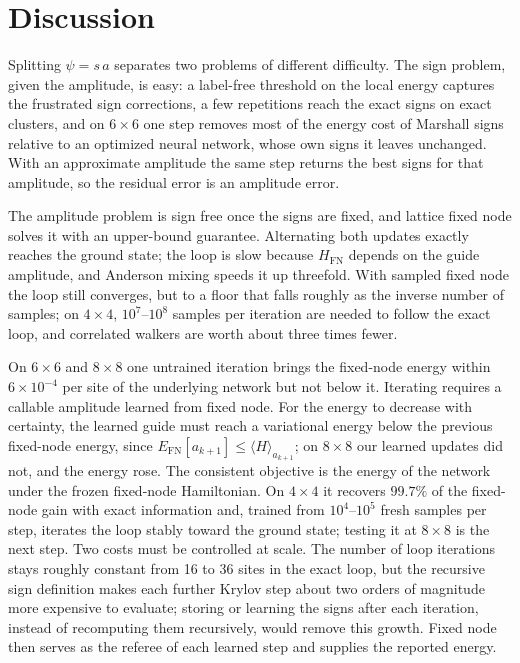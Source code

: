 \documentclass[aps,prb,reprint,onecolumn,superscriptaddress,floatfix]{revtex4-2}
\newcommand{\FN}{\mathrm{FN}}
\begin{document}
\section{Discussion}

Splitting $\psi=s\,a$ separates two problems of different difficulty. The
sign problem, given the amplitude, is easy: a label-free threshold on the
local energy captures the frustrated sign corrections, a few repetitions
reach the exact signs on exact clusters, and on $6\times6$ one step removes
most of the energy cost of Marshall signs relative to an optimized neural
network, whose own signs it leaves unchanged. With an approximate
amplitude the same step returns the best signs for that amplitude, so the
residual error is an amplitude error.

The amplitude problem is sign free once the signs are fixed, and lattice fixed
node solves it with an upper-bound guarantee. Alternating both updates exactly
reaches the ground state; the loop is slow because $H_\FN$ depends on the guide
amplitude, and Anderson mixing speeds it up threefold. With sampled fixed node
the loop still converges, but to a floor that falls roughly as the inverse
number of samples; on $4\times4$, $10^7$--$10^8$ samples per iteration are
needed to follow the exact loop, and correlated walkers are worth about three
times fewer.

On $6\times6$ and $8\times8$ one untrained iteration brings the fixed-node
energy within $6\times10^{-4}$ per site of the underlying network but not
below it. Iterating requires a callable amplitude learned from fixed node.
For the energy to decrease with certainty, the learned guide must reach a
variational energy below the previous fixed-node energy, since
$E_\FN[a_{k+1}]\leq\langle H\rangle_{a_{k+1}}$; on $8\times8$ our learned
updates did not, and the energy rose. The consistent objective is the energy
of the network under the frozen fixed-node Hamiltonian. On $4\times4$ it
recovers $99.7\%$ of the fixed-node gain with exact information and, trained
from $10^4$--$10^5$ fresh samples per step, iterates the loop stably toward the
ground state; testing it at $8\times8$ is the next step. Two costs must be controlled at scale. The number of
loop iterations stays roughly constant from 16 to 36 sites in the exact loop,
but the recursive sign definition makes each further Krylov step about two
orders of magnitude more expensive to evaluate; storing or learning the signs
after each iteration, instead of recomputing them recursively, would remove
this growth. Fixed node then serves as the referee of each
learned step and supplies the reported energy.
\end{document}
